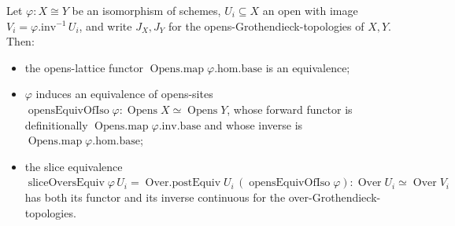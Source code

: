 \begin{lemma}
  \label{mk-lem:slice_overs_equiv_continuity}

  Let \(\varphi : X \cong Y\) be an isomorphism of schemes, \(U_i \subseteq X\) an open with image
  \(V_i = \varphi.\mathrm{inv}^{-1}\,U_i\), and write \(J_X, J_Y\) for the opens-Grothendieck-topologies
  of \(X, Y\). Then:
  \begin{itemize}
    \item the opens-lattice functor \(\operatorname{Opens.map}\varphi.\mathrm{hom}.\mathrm{base}\) is an
      equivalence;
    \item \(\varphi\) induces an equivalence of opens-sites \(\operatorname{opensEquivOfIso}\varphi :
      \operatorname{Opens} X \simeq \operatorname{Opens} Y\), whose forward functor is definitionally
      \(\operatorname{Opens.map}\varphi.\mathrm{inv}.\mathrm{base}\) and whose inverse is
      \(\operatorname{Opens.map}\varphi.\mathrm{hom}.\mathrm{base}\);
    \item the slice equivalence \(\operatorname{sliceOversEquiv}\varphi\,U_i = \operatorname{Over.postEquiv}
      U_i\,(\operatorname{opensEquivOfIso}\varphi) : \operatorname{Over} U_i \simeq \operatorname{Over} V_i\)
      has both its functor and its inverse continuous for the over-Grothendieck-topologies.
  \end{itemize}
\end{lemma}
